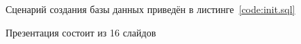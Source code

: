 Сценарий создания базы данных приведён в листинге~\ref{code:init.sql}

\clearpage
{}
Презентация состоит из 16 слайдов